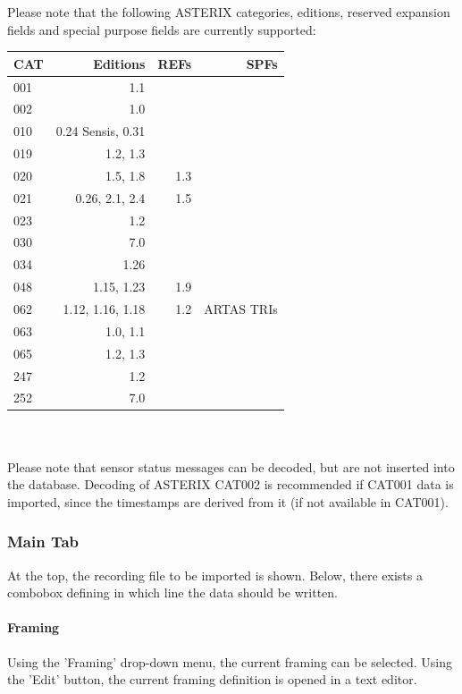 Please note that the following ASTERIX categories, editions, reserved expansion fields and special purpose fields are currently supported: \\

\begin{tabular}{ | l | r | r | r |}
\hline
  CAT & Editions & REFs & SPFs  \\ \hline
  001 & 1.1 &  &  \\ \hline
  002 & 1.0 &  &  \\ \hline
  010 & 0.24 Sensis, 0.31  &  &  \\ \hline
  019 & 1.2, 1.3 & & \\ \hline
  020 & 1.5, 1.8 & 1.3 & \\ \hline
  021 & 0.26, 2.1, 2.4 & 1.5 & \\ \hline
  023 & 1.2 & & \\ \hline
  030 & 7.0 & & \\ \hline
  034 & 1.26 & & \\ \hline
  048 & 1.15, 1.23 & 1.9 & \\ \hline
  062 & 1.12, 1.16, 1.18 & 1.2 & ARTAS TRIs \\ \hline
  063 & 1.0, 1.1 & & \\ \hline
  065 & 1.2, 1.3 & & \\ \hline
  247 & 1.2 & & \\ \hline
  252 & 7.0 & & \\ \hline
\end{tabular} \\
\  \\

Please note that sensor status messages can be decoded, but are not inserted into the database. 
Decoding of ASTERIX CAT002 is recommended if CAT001 data is imported, since the timestamps are derived from it (if not available in CAT001).

\subsubsection{Main Tab}

At the top, the recording file to be imported is shown. Below, there exists a combobox defining in which line the data should be written. \\

\paragraph{Framing}
Using the 'Framing' drop-down menu, the current framing can be selected. Using the 'Edit' button, the current framing definition is opened in a text editor.

